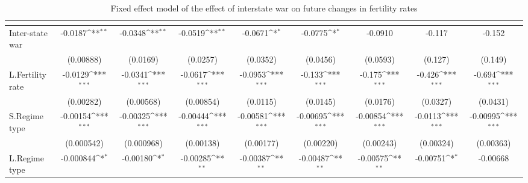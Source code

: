 \begin{table}[htbp]\centering
\def\sym#1{\ifmmode^{#1}\else\(^{#1}\)\fi}
\caption{Fixed effect model of the effect of interstate war on future changes in fertility rates \label{interwarfertility}}
\begin{tabular}{l*{8}{c}}
\hline\hline
                    &&&&&&&&\\
\hline
Inter-state war     &     -0.0187\sym{**} &     -0.0348\sym{**} &     -0.0519\sym{**} &     -0.0671\sym{*}  &     -0.0775\sym{*}  &     -0.0910         &      -0.117         &      -0.152         \\
                    &   (0.00888)         &    (0.0169)         &    (0.0257)         &    (0.0352)         &    (0.0456)         &    (0.0593)         &     (0.127)         &     (0.149)         \\
[1em]
L.Fertility rate    &     -0.0129\sym{***}&     -0.0341\sym{***}&     -0.0617\sym{***}&     -0.0953\sym{***}&      -0.133\sym{***}&      -0.175\sym{***}&      -0.426\sym{***}&      -0.694\sym{***}\\
                    &   (0.00282)         &   (0.00568)         &   (0.00854)         &    (0.0115)         &    (0.0145)         &    (0.0176)         &    (0.0327)         &    (0.0431)         \\
[1em]
S.Regime type       &    -0.00154\sym{***}&    -0.00325\sym{***}&    -0.00444\sym{***}&    -0.00581\sym{***}&    -0.00695\sym{***}&    -0.00854\sym{***}&     -0.0113\sym{***}&    -0.00995\sym{***}\\
                    &  (0.000542)         &  (0.000968)         &   (0.00138)         &   (0.00177)         &   (0.00220)         &   (0.00243)         &   (0.00324)         &   (0.00363)         \\
[1em]
L.Regime type       &   -0.000844\sym{*}  &    -0.00180\sym{*}  &    -0.00285\sym{**} &    -0.00387\sym{**} &    -0.00487\sym{**} &    -0.00575\sym{**} &    -0.00751\sym{*}  &    -0.00668         \\

\end{tabular}
\end{table}
